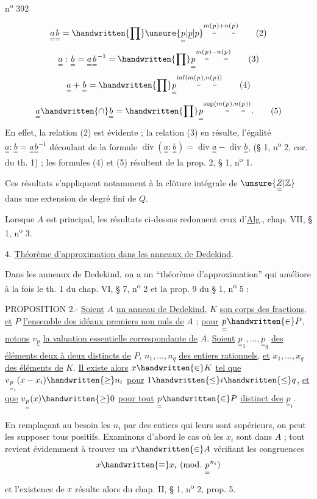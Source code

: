 \hfill n\textsuperscript{o} 392

\[
\underset{=}{a}\underset{=}{b}=\handwritten{\prod}\unsure{\underset{=}{p}|\underline{p}|p}^{m(\underset{=}{p})+n(\underset{=}{p})}\tag*{(2)}
\]
\[
\underset{=}{a}:\underset{=}{b}=\underset{=}{a}\underset{=}{b}^{-1}=\handwritten{\prod}\underset{=}{p}^{m(\underset{=}{p})-n(\underset{=}{p})}\tag*{(3)}
\]
\[
\underset{=}{a}+\underset{=}{b}=\handwritten{\prod}\underset{=}{p}^{\inf(m(\underset{=}{p}),n(\underset{=}{p}))}\tag*{(4)}
\]
\[
\underset{=}{a}\handwritten{\cap}\underset{=}{b}=\handwritten{\prod}\underset{=}{p}^{\sup(m(\underset{=}{p}),n(\underset{=}{p}))}.\tag*{(5)}
\]
En effet, la relation (2) est évidente ; la relation (3) en résulte, l'égalité $\underset{=}{a}:\underset{=}{b}=\underset{=}{a}\underset{=}{b}^{-1}$ découlant de la formule $\operatorname{div}(\underset{=}{a}:\underset{=}{b})=\operatorname{div}\underset{=}{a}-\operatorname{div}\underset{=}{b}$, (§ 1, n\textsuperscript{o} 2, cor. du th. 1) ; les formules (4) et (5) résultent de la prop. 2, § 1, n\textsuperscript{o} 1.

Ces résultats s'appliquent notamment à la clôture intégrale de $\unsure{\underset{=}{Z}|\mathbb Z}$ dans une extension de degré fini de $Q$.

Lorsque $A$ est principal, les résultats ci-dessus redonnent ceux d'\uline{Alg}., chap. VII, § 1, n\textsuperscript{o} 3.

4. \uline{Théorème d'approximation dans les anneaux de Dedekind}.

Dans les anneaux de Dedekind, on a un ``théorème d'approximation'' qui améliore à la fois le th. 1 du chap. VI, § 7, n\textsuperscript{o} 2 et la prop. 9 du § 1, n\textsuperscript{o} 5 :

PROPOSITION 2.- \uline{Soient} $A$ \uline{un anneau de Dedekind}, $K$ \uline{son corps des fractions}, \uline{et} $P$ \uline{l'ensemble des idéaux premiers non nuls de} $A$ ; \uline{pour} $\underset{=}{p}\handwritten{\in}P$, \uline{notons} $v_{\underset{=}{p}}$ \uline{la valuation essentielle correspondante de} $A$. \uline{Soient} $\underset{=}{p}_1,\ldots,\underset{=}{p}_q$ \uline{des éléments deux à deux distincts de} $P$, $n_1,\ldots,n_q$ \uline{des entiers rationnels}, \uline{et} $x_1,\ldots,x_q$ \uline{des éléments de} $K$. \uline{Il existe alors} $x\handwritten{\in}K$ \uline{tel que} $v_{\underset{=}{p}_i}(x-x_i)\handwritten{\geq}n_i$ \uline{pour} $1\handwritten{\leq}i\handwritten{\leq}q$, \uline{et que} $v_{\underset{=}{p}}(x)\handwritten{\geq}0$ \uline{pour tout} $\underset{=}{p}\handwritten{\in}P$ \uline{distinct des} $\underset{=}{p}_i$.

En remplaçant au besoin les $n_i$ par des entiers qui leurs sont supérieurs, on peut les supposer tous positifs. Examinons d'abord le cas où les $x_i$ sont dans $A$ ; tout revient évidemment à trouver un $x\handwritten{\in}A$ vérifiant les congruences
\[
x\handwritten{\equiv}x_i\ (\mathrm{mod.}\ \underset{=}{p}^{n_i})
\]
et l'existence de $x$ résulte alors du chap. II, § 1, n\textsuperscript{o} 2, prop. 5.
